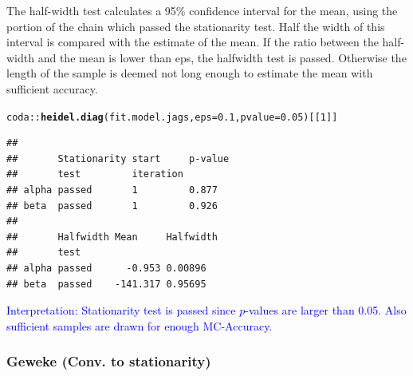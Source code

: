 \documentclass{article}\usepackage[]{graphicx}\usepackage[]{xcolor}
\makeatletter
\newcommand{\hlnum}[1]{\textcolor[rgb]{0.686,0.059,0.569}{#1}}%
\newcommand{\hlopt}[1]{\textcolor[rgb]{0,0,0}{#1}}%
\newcommand{\hlstd}[1]{\textcolor[rgb]{0.345,0.345,0.345}{#1}}%
\newcommand{\hlkwc}[1]{\textcolor[rgb]{0.333,0.667,0.333}{#1}}%
\newcommand{\hlkwd}[1]{\textcolor[rgb]{0.737,0.353,0.396}{\textbf{#1}}}%
\newenvironment{kframe}{%
 \def\at@end@of@kframe{}%
 \ifinner\ifhmode%
  \def\at@end@of@kframe{\end{minipage}}%
  \begin{minipage}{\columnwidth}%
 \fi\fi%
 \def\FrameCommand##1{\hskip\@totalleftmargin \hskip-\fboxsep
 \colorbox{shadecolor}{##1}\hskip-\fboxsep
     \hskip-\linewidth \hskip-\@totalleftmargin \hskip\columnwidth}%
 \MakeFramed {\advance\hsize-\width
   \@totalleftmargin\z@ \linewidth\hsize
   \@setminipage}}%
 {\par\unskip\endMakeFramed%
 \at@end@of@kframe}
\newenvironment{knitrout}{}{} %
\makeatother
\begin{document}
\begin{multicols*}{2}
The half-width test calculates a 95\% confidence interval for the mean, using the portion of the chain which passed the stationarity test. Half the width of this interval is compared with the estimate of the mean. If the ratio between the half-width and the mean is lower than eps, the halfwidth test is passed. Otherwise the length of the sample is deemed not long enough to estimate the mean with sufficient accuracy.
\tiny
\begin{knitrout}
\color{fgcolor}\begin{kframe}
\begin{alltt}
\hlstd{coda}\hlopt{::}\hlkwd{heidel.diag}\hlstd{(fit.model.jags,}\hlkwc{eps}\hlstd{=}\hlnum{0.1}\hlstd{,} \hlkwc{pvalue}\hlstd{=}\hlnum{0.05}\hlstd{)[[}\hlnum{1}\hlstd{]]}
\end{alltt}
\begin{verbatim}
##                                     
##       Stationarity start     p-value
##       test         iteration        
## alpha passed       1         0.877  
## beta  passed       1         0.926  
##                                   
##       Halfwidth Mean     Halfwidth
##       test                        
## alpha passed      -0.953 0.00896  
## beta  passed    -141.317 0.95695
\end{verbatim}
\end{kframe}
\end{knitrout}
\footnotesize
\textcolor{blue}{Interpretation: Stationarity test is passed since $p$-values are larger than 0.05. Also sufficient samples are drawn for enough MC-Accuracy.}

\subsubsection{Geweke (Conv. to stationarity)}


\end{multicols*}
\end{document}
